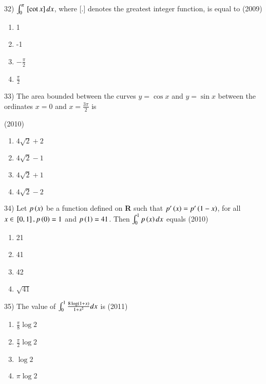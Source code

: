 \documentclass[journal,12pt,twocolumn]{IEEEtran}
\theoremstyle{remark}
\begin{document}
32)
	 $\int_0^\pi{}\left[\cot x\right]dx$, where [.] denotes the greatest integer function, is equal to
		\hfill{(2009)}

		\begin{multicols}{4}
			\begin{enumerate}[label=(\alph*)]
				\item 1
				\item -1
				\item $-\frac{\pi}{2}$
				\item $\frac{\pi}{2}$
			\end{enumerate}
		\end{multicols}

33)
	 The area bounded between the curves $y=\cos x$ and $y=\sin x$ between the ordinates $x=0$ and $x=\frac{3\pi}{2}$ is

		\hfill{(2010)}

		\begin{multicols}{2}
			\begin{enumerate}[label=(\alph*)]
				\item $4\sqrt{2}+2$
				\item $4\sqrt{2}-1$
				\item $4\sqrt{2}+1$
				\item $4\sqrt{2}-2$
			\end{enumerate}
		\end{multicols}

34)
	 Let $p\left(x\right)$ be a function defined on \textbf{R} such that $p'\left(x\right)=p'\left(1-x\right)$, for all $x\in{}\left[0,1\right],p\left(0\right)=1$ and $p\left(1\right)=41$. Then $\int_0^1p\left(x\right)dx$ equals
		\hfill{(2010)}

		\begin{multicols}{4}
			\begin{enumerate}[label=(\alph*)]
				\item 21
				\item 41
				\item 42
				\item $\sqrt{41}$
			\end{enumerate}
		\end{multicols}

35)
	 The value of $\int_0^1\frac{8\log\left(1+x\right)}{1+x^2}dx$ is
		\hfill{(2011)}

		\begin{multicols}{2}
			\begin{enumerate}[label=(\alph*)]
				\item $\frac{\pi}{8}\log2$
				\item $\frac{\pi}{2}\log2$
				\item $\log 2$
				\item $\pi \log2$
			\end{enumerate}
		\end{multicols}
\end{document}
